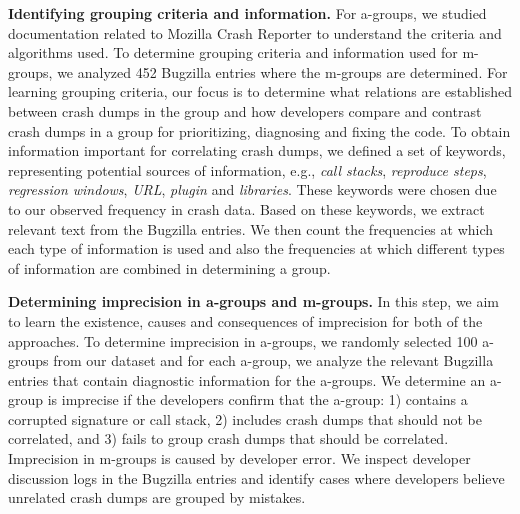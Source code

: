 \documentclass{llncs}
\begin{document}
{\bf Identifying grouping criteria and information.} For a-groups, we studied documentation related to Mozilla Crash Reporter to understand the criteria and algorithms used. To determine grouping criteria and information used for m-groups, we analyzed  452 Bugzilla entries where the m-groups are determined. For learning grouping criteria, our focus is to determine what relations are established between crash dumps in the group and how developers compare and contrast crash dumps in a group for prioritizing, diagnosing and fixing the code. To obtain information important for correlating crash dumps, we defined a set of keywords, representing potential sources of information,  e.g., {\it call stacks}, {\it reproduce steps}, {\it regression windows}, {\it URL}, {\it plugin} and {\it libraries}. These keywords were chosen due to our observed frequency in crash data. Based on these keywords, we extract relevant text from the Bugzilla entries. We then count the frequencies at which each type of information is used and also the frequencies at which different types of information are combined in determining a group.


%

{\bf Determining imprecision in a-groups and m-groups.} In this step, we aim to learn the existence, causes and consequences of imprecision for both of the approaches. To determine imprecision in a-groups, we randomly selected 100 a-groups from our dataset and for each a-group, we analyze the relevant Bugzilla entries that contain diagnostic information for the a-groups. We determine an a-group is imprecise if the developers confirm that the a-group: 1) contains a corrupted signature or call stack, 2) includes crash dumps that should not be correlated, and 3) fails to group crash dumps that should be correlated. Imprecision in m-groups is caused by developer error. We inspect developer discussion logs in the Bugzilla entries and identify cases where developers believe unrelated crash dumps are grouped by mistakes.

\end{document}
